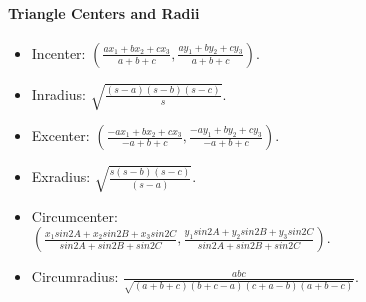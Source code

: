 \paragraph{Triangle Centers and Radii}
\begin{itemize}
    \item Incenter: $(\frac{ax_1 + bx_2 + cx_3}{a + b + c},\frac{ay_1 + by_2 + cy_3}{a + b + c})$.
    \item Inradius: $\sqrt{\frac{(s-a)(s-b)(s-c)}{s}}$.
    \item Excenter: $(\frac{-ax_1 + bx_2 + cx_3}{-a + b + c},\frac{-ay_1 + by_2 + cy_3}{-a + b + c})$.
    \item Exradius: $\sqrt{\frac{s(s-b)(s-c)}{(s-a)}}$.
    \item Circumcenter:\\ $(\frac{x_1sin2A+x_2sin2B+x_3sin2C}{sin2A+sin2B+sin2C},\frac{y_1sin2A+y_2sin2B+y_3sin2C}{sin2A+sin2B+sin2C})$.
    \item Circumradius: $\frac{abc}{\sqrt{(a+b+c)(b+c-a)(c+a-b)(a+b-c)}}$.
\end{itemize}